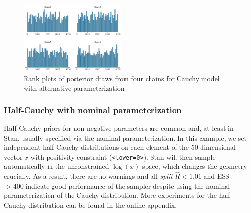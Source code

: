 \documentclass[american,]{article}
\begin{document}
\begin{figure}[tp]
  \centering
  \includegraphics[width=0.47\textwidth]{graphics/hist-fit-alt1-1.pdf}
  \caption{Rank plots of posterior draws from four chains for Cauchy model with alternative parameterization.}
  \label{fig:hist-fit-alt1-1}
\end{figure}

\hypertarget{half-cauchy-with-nominal-parameterization}{%
\subsubsection{Half-Cauchy with nominal
parameterization}\label{half-cauchy-with-nominal-parameterization}}

Half-Cauchy priors for non-negative parameters are common and, at least in Stan, 
usually specified via the nominal parameterization.
In this example, we set independent half-Cauchy distributions on each element
of the 50 dimensional vector $x$ with positivity constraint
(\texttt{\textless{}lower=0\textgreater{}}). Stan will then
sample automatically in the unconstrained \(\log(x)\) space, which
changes the geometry crucially. As a result, there are no warnings and all
\emph{split}-\(\widehat{R}<1.01\) and ESS \(>400\) indicate good
performance of the sampler despite using the nominal parameterization of
the Cauchy distribution. More experiments for the half-Cauchy distribution 
can be found in the online appendix.






\end{document}
